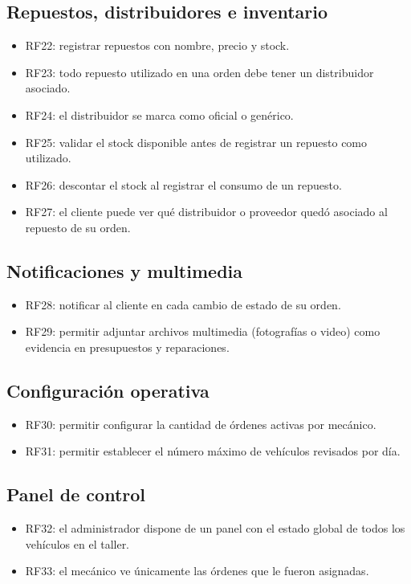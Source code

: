\documentclass[11pt]{article}
\begin{document}
\subsection{Repuestos, distribuidores e inventario}
\begin{itemize}
  \item RF22: registrar repuestos con nombre, precio y stock.
  \item RF23: todo repuesto utilizado en una orden debe tener un distribuidor asociado.
  \item RF24: el distribuidor se marca como oficial o genérico.
  \item RF25: validar el stock disponible antes de registrar un repuesto como utilizado.
  \item RF26: descontar el stock al registrar el consumo de un repuesto.
  \item RF27: el cliente puede ver qué distribuidor o proveedor quedó asociado al repuesto de su orden.
\end{itemize}

\subsection{Notificaciones y multimedia}
\begin{itemize}
  \item RF28: notificar al cliente en cada cambio de estado de su orden.
  \item RF29: permitir adjuntar archivos multimedia (fotografías o video) como evidencia en presupuestos y reparaciones.
\end{itemize}

\subsection{Configuración operativa}
\begin{itemize}
  \item RF30: permitir configurar la cantidad de órdenes activas por mecánico.
  \item RF31: permitir establecer el número máximo de vehículos revisados por día.
\end{itemize}

\subsection{Panel de control}
\begin{itemize}
  \item RF32: el administrador dispone de un panel con el estado global de todos los vehículos en el taller.
  \item RF33: el mecánico ve únicamente las órdenes que le fueron asignadas.
\end{itemize}
\end{document}

